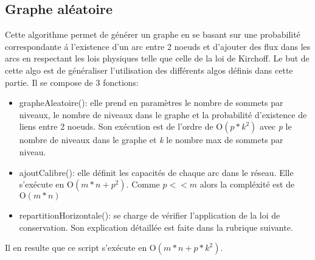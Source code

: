 \documentclass[onecolumn, 12pt]{article}
\begin{document}
\subsection{Graphe al\'eatoire} 
Cette algorithme permet de g\'en\'erer un graphe en se basant sur une probabilit\'e correspondante \'a l'existence d'un arc entre 2 noeuds et d'ajouter des flux dans les arcs en respectant les lois physiques telle que celle de la loi de Kirchoff. Le but de cette algo est de g\'en\'eraliser l'utilisation des diff\'erents algos  d\'efinis dans cette partie. Il se compose de 3 fonctions:
\begin{itemize}
\item grapheAleatoire(): elle prend en param\`etres le nombre de sommets par niveaux, le nombre de niveaux dans le graphe et la probabilit\'e d'existence de liens entre 2 noeuds. Son ex\'ecution est de l'ordre de $\mathrm{O}{(p*k^{2})}$ avec \emph{p} le nombre de niveaux dans le graphe et \emph{k} le nombre max de sommets par niveau.
\item ajoutCalibre(): elle d\'efinit les capacit\'es de chaque arc dans le r\'eseau. Elle s'ex\'ecute en $\mathrm{O}{(m*n+p^{2})}$. Comme $p<<m$ alors la compl\'exit\'e est de $\mathrm{O}{(m*n)}$
\item repartitionHorizontale(): se charge de v\'erifier l'application de la loi de conservation. Son explication d\'etaill\'ee est faite dans la rubrique suivante.
\end{itemize}
Il en resulte que ce script s'ex\'ecute en  $\mathrm{O}{(m*n+p*k^{2})}$.
\end{document}
